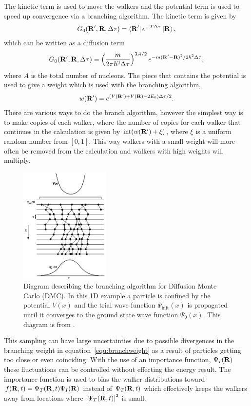 The kinetic term is used to move the walkers and the potential term is used to speed up convergence via a branching algorithm. The kinetic term is given by
\begin{equation}
   G_0(\mathbf{R}',\mathbf{R},\Delta \tau) = \left< \mathbf{R}' \right|e^{-T\Delta \tau}\left| \mathbf{R} \right>,
\end{equation}
which can be written as a diffusion term
\begin{equation}
   G_0(\mathbf{R}',\mathbf{R},\Delta \tau) = \left(\frac{m}{2\pi\hbar^2\Delta\tau}\right)^{3A/2}e^{-m(\mathbf{R}'-\mathbf{R})^2/2\hbar^2\Delta\tau},
\end{equation}
where $A$ is the total number of nucleons.
The piece that contains the potential is used to give a weight which is used with the branching algorithm,
\begin{equation}
   w(\mathbf{R}') = e^{(V(\mathbf{R}')+V(\mathbf{R})-2E_0)\Delta\tau/2}.
   \label{equ:branchweight}
\end{equation}
There are various ways to do the branch algorithm, however the simplest way is to make copies of each walker, where the number of copies for each walker that continues in the calculation is given by $\mathrm{int}(w(\mathbf{R}')+\xi)$, where $\xi$ is a uniform random number from $[0,1]$. This way walkers with a small weight will more often be removed from the calculation and walkers with high weights will multiply.
\begin{figure}[h!]
   \centering
   \includegraphics[width=0.4\textwidth]{figures/branching.png}
   \caption{Diagram describing the branching algorithm for Diffusion Monte Carlo (DMC). In this 1D example a particle is confined by the potential $V(x)$ and the trial wave function $\Psi_\text{init}(x)$ is propagated until it converges to the ground state wave function $\Psi_0(x)$. This diagram is from \cite{foulkes2001}.}
   \label{fig:branching}
\end{figure}

This sampling can have large uncertainties due to possible divergences in the branching weight in equation~\ref{equ:branchweight} as a result of particles getting too close or even coinciding. With the use of an importance function, $\Psi_I(\mathbf{R})$ these fluctuations can be controlled without effecting the energy result. The importance function is used to bias the walker distributions toward $f(\mathbf{R},t) = \Psi_T(\mathbf{R},t)\Psi_I(\mathbf{R})$ instead of $\Psi_T(\mathbf{R},t)$ which effectively keeps the walkers away from locations where $\left|\Psi_T(\mathbf{R},t)\right|^2$ is small.

